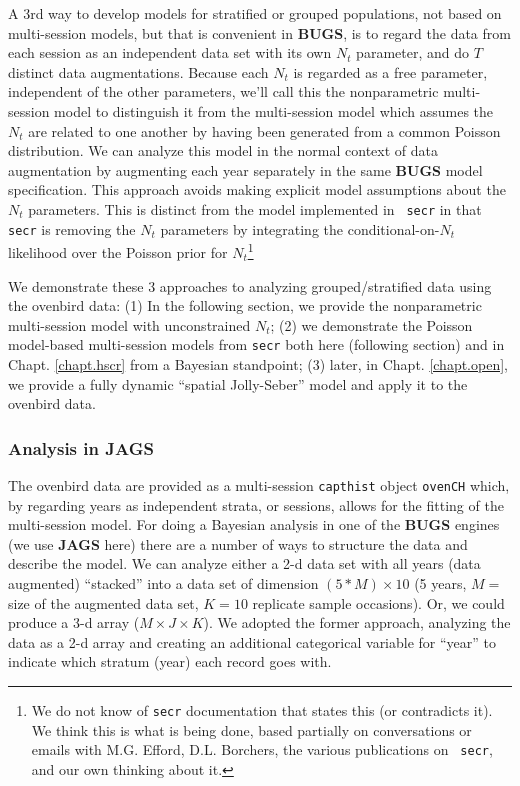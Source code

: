 A 3rd way to develop models for stratified or grouped populations, not
based on multi-session models, but that is convenient in {\bf BUGS},
is to regard the data from each session as an independent data set
with its own $N_{t}$ parameter, and do $T$ distinct data
augmentations. Because each $N_{t}$ is regarded as a free parameter,
independent of the other parameters, we'll call this the nonparametric
multi-session model to distinguish it from the multi-session model
which assumes the $N_{t}$ are related to one another by having been
generated from a common Poisson distribution.  We can analyze this
model in the normal context of data augmentation by augmenting each
year separately in the same {\bf BUGS} model specification. This
approach avoids making explicit model assumptions about the $N_{t}$
parameters.  This is distinct from the model implemented in \mbox{\tt
  secr} in that \mbox{\tt secr} is removing the $N_{t}$ parameters by
integrating the conditional-on-$N_{t}$ likelihood over the Poisson
prior for $N_{t}$\footnote{We do not know of \mbox{\tt secr}
  documentation that states this (or contradicts it). We think this is
  what is being done, based partially on conversations or emails with
M.G. Efford,   D.L. Borchers, the various publications on \mbox{\tt
  secr}, and our own thinking about it.}


We demonstrate these 3 approaches to analyzing grouped/stratified data
using the ovenbird data: (1) In the following section, we provide the
nonparametric multi-session model with unconstrained $N_{t}$; (2) we
demonstrate the Poisson model-based multi-session models from
\mbox{\tt secr} both here (following section) and in
Chapt. \ref{chapt.hscr} from a Bayesian standpoint; (3) later, in
Chapt. \ref{chapt.open}, we provide a fully dynamic ``spatial
Jolly-Seber'' model and apply it to the ovenbird data.


\subsubsection{Analysis in JAGS}

The ovenbird data are provided as a multi-session \mbox{\tt capthist}
object \mbox{\tt ovenCH} which, by regarding years as independent
strata, or sessions, allows for the fitting of the multi-session
model.  For doing a Bayesian analysis in one of the {\bf BUGS} engines
(we use {\bf JAGS} here) there are a number of ways to structure the
data and describe the model.  We can analyze either a 2-d data set
with all years (data augmented) ``stacked'' into a data set of
dimension $(5*M) \times 10$ (5 years, $M=$ size of the augmented data
set, $K=10$ replicate sample occasions). Or, we could produce a 3-d
array ($M \times J \times K$). We adopted the former approach,
analyzing the data as a 2-d array and creating an additional
categorical variable for ``year'' to indicate which stratum (year)
each record goes with.

